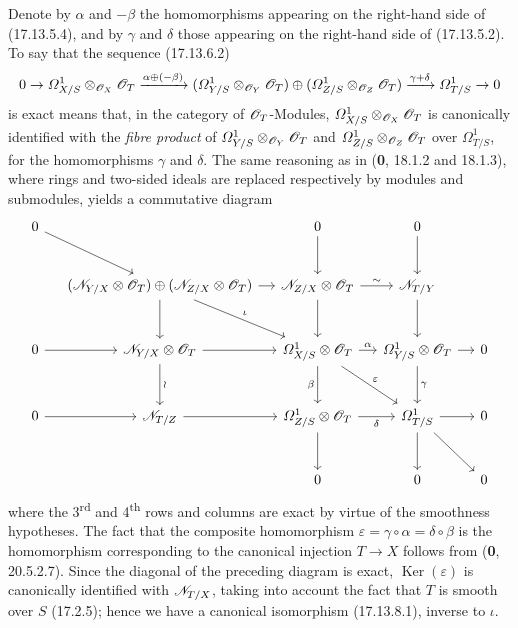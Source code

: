 
Denote by $\alpha$ and $-\beta$ the homomorphisms appearing on the right-hand side of (17.13.5.4), and by $\gamma$ and $\delta$ those appearing on the right-hand side of (17.13.5.2). To say that the sequence (17.13.6.2)
\[
0\to\varOmega^1_{X/S}\otimes_{\mathscr{O}_X}\mathscr{O}_T
\xrightarrow{\alpha\oplus(-\beta)}
(\varOmega^1_{Y/S}\otimes_{\mathscr{O}_Y}\mathscr{O}_T)\oplus
(\varOmega^1_{Z/S}\otimes_{\mathscr{O}_Z}\mathscr{O}_T)
\xrightarrow{\gamma+\delta}\varOmega^1_{T/S}\to0
\]
is exact means that, in the category of $\mathscr{O}_T$-Modules, $\varOmega^1_{X/S}\otimes_{\mathscr{O}_X}\mathscr{O}_T$ is canonically identified with the \emph{fibre product} of $\varOmega^1_{Y/S}\otimes_{\mathscr{O}_Y}\mathscr{O}_T$ and $\varOmega^1_{Z/S}\otimes_{\mathscr{O}_Z}\mathscr{O}_T$ over $\varOmega^1_{T/S}$, for the homomorphisms $\gamma$ and $\delta$. The same reasoning as in (\textbf{0}, 18.1.2 and 18.1.3), where rings and two-sided ideals are replaced respectively by modules and submodules, yields a commutative diagram
{\scriptsize
\[
\begin{tikzcd}[column sep=small,row sep=large]
0 \ar[dr] & & 0 \ar[d] & 0 \ar[d] & \\
& (\sh{N}_{Y/X}\otimes\sh{O}_T)\oplus(\sh{N}_{Z/X}\otimes\sh{O}_T)
  \ar[r] \ar[d] \ar[dr,"\iota"]
& \sh{N}_{Z/X}\otimes\sh{O}_T \ar[r,"\sim"] \ar[d]
& \sh{N}_{T/Y} \ar[d] & \\
0 \ar[r] & \sh{N}_{Y/X}\otimes\sh{O}_T \ar[r] \ar[d,"\wr"]
& \varOmega^1_{X/S}\otimes\sh{O}_T \ar[r,"\alpha"] \ar[d,"\beta" swap] \ar[dr,"\varepsilon"]
& \varOmega^1_{Y/S}\otimes\sh{O}_T \ar[r] \ar[d,"\gamma"] & 0\\
0 \ar[r] & \sh{N}_{T/Z} \ar[r]
& \varOmega^1_{Z/S}\otimes\sh{O}_T \ar[r,"\delta" swap] \ar[d]
& \varOmega^1_{T/S} \ar[r] \ar[d] \ar[dr] & 0\\
& & 0 & 0 & 0
\end{tikzcd}
\]
}
where the 3\textsuperscript{rd} and 4\textsuperscript{th} rows and columns are exact by virtue of the smoothness hypotheses. The fact that the composite homomorphism $\varepsilon=\gamma\circ\alpha=\delta\circ\beta$ is the homomorphism corresponding to the canonical injection $T\to X$ follows from (\textbf{0}, 20.5.2.7). Since the diagonal of the preceding diagram is exact, $\operatorname{Ker}(\varepsilon)$ is canonically identified with $\mathscr{N}_{T/X}$, taking into account the fact that $T$ is smooth over $S$ (17.2.5); hence we have a canonical isomorphism (17.13.8.1), inverse to $\iota$.

